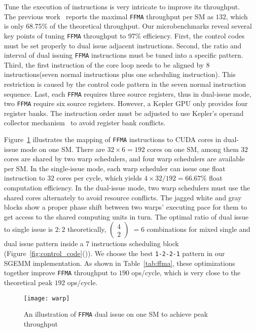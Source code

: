 Tune the execution of instructions is very intricate to improve its throughput. 
The previous work~\cite{lai} reports the maximal {\tt FFMA} throughput per SM as $132$, which is only $68.75\%$ of the theoretical throughput. 
Our microbenchmarks reveal several key points of tuning {\tt FFMA} throughput to $97\%$ efficiency.
First, the control codes must be set properly to dual issue adjacent instructions. 
Second, the ratio and interval of dual issuing {\tt FFMA} instructions must be tuned into a specific pattern.
Third, the first instruction of the core loop needs to be aligned by 8 instructions(seven
normal instructions plus one scheduling instruction). This restriction
is caused by the control code pattern in the seven normal instruction sequence.
Last, each {\tt FFMA} requires three source registers, thus in dual-issue mode, two {\tt FFMA} require six source registers.
However, a Kepler GPU only provides four register banks.
The instruction order must be adjusted to use Kepler's operand collector mechanism~\cite{collector,tarjan2012policy} to avoid register bank conflicts. 

Figure~\ref{fig:warp} illustrates the mapping of {\tt FFMA} instructions to
CUDA cores in dual-issue mode on one SM. There are $32\times 6=192$ cores on
one SM, among them $32$ cores are shared by two warp schedulers, and four warp schedulers are available per SM. 
In the single-issue mode, each warp scheduler can issue one float instruction to $32$ cores per cycle, which yields $4\times32/192=66.67\%$ float computation efficiency. 
In the dual-issue mode, two warp schedulers must use the shared cores alternately to avoid resource conflicts.
The jagged white and gray blocks show a proper phase shift between two warps' executing pace for them to get access to the shared computing units in turn.
The optimal ratio of dual issue to single issue is $2:2$ theoretically, 
\( \begin{pmatrix} 4 \\ 2 \end{pmatrix} \) $=6$ combinations for mixed single and dual issue
pattern inside a $7$ instructions scheduling block (Figure~\ref{fig:control_code}()).
We choose the best {\tt 1-2-2-1} pattern in our SGEMM implementation.
As shown in Table~\ref{tab:ffma}, these optimizations together improve {\tt FFMA} throughput to $190$ ops/cycle, which is very close to the theoretical peak $192$ ops/cycle.
\begin{figure}[htbp]
\begin{center}
\texttt{[image: warp]}
    \caption{An illustration of {\tt FFMA} dual issue on one SM to achieve peak throughput}
\label{fig:warp}
\end{center}
\end{figure}

